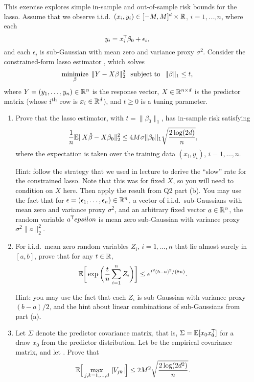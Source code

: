 \documentclass{article}
\begin{document}
\def\hSigma{\hat\Sigma}

This exercise explores simple in-sample and out-of-sample risk bounds for the
lasso. Assume that we observe i.i.d.\ $(x_i,y_i) \in [-M,M]^d \times \mathbb{R}$,
$i=1,\dots,n$, where each   
\[
y_i = x_i^{\mathsf{T}} \beta_0 + \epsilon_i,
\]
and each $\epsilon_i$ is sub-Gaussian with mean zero and variance proxy
$\sigma^2$. Consider the constrained-form lasso estimator \smash{$\hbeta$}, 
which solves  
\[
\mathop{\mathrm{minimize}}_\beta \; \|Y - X\beta\|_2^2 \;\; \mathop{\mathrm{subject\,\,to}} \;\; \|\beta\|_1 \leq t,    
\]
where $Y = (y_1,\dots,y_n) \in \mathbb{R}^n$ is the response vector, $X \in \mathbb{R}^{n \times
  d}$ is the predictor matrix (whose $i^{\text{th}}$ row is $x_i \in \mathbb{R}^d$), and $t \geq
0$ is a tuning parameter.

\begin{enumerate}[label=(\alph*)]
\item Prove that the lasso estimator, with $t=\|\beta_0\|_1$, has in-sample risk
  satisfying 
  \marginpar{\small [3 pts]}
  \[
  \frac{1}{n} \mathbb{E} \|X\hat{\beta} - X\beta_0\|_2^2 \leq 4M \sigma \|\beta_0\|_1
  \sqrt{\frac{2 \log(2d)}{n}},  
  \]
  where the expectation is taken over the training data $(x_i,y_i)$,
  $i=1,\dots,n$. 

  Hint: follow the strategy that we used in lecture to derive the ``slow'' rate 
  for the constrained lasso. Note that this was for fixed $X$, so you will need
  to condition on $X$ here. Then apply the result from Q2 part (b). You may use
  the fact that for $\epsilon = (\epsilon_1,\dots,\epsilon_n) \in \mathbb{R}^n$, a
  vector of i.i.d.\ sub-Gaussians with mean zero and variance proxy $\sigma^2$,
  and an arbitrary fixed vector $a \in \mathbb{R}^n$, the random variable $a^{\mathsf{T}} epsilon$
  is mean zero sub-Gaussian with variance proxy $\sigma^2 \|a\|_2^2$. 

\item For i.i.d.\ mean zero random variables $Z_i$, $i=1,\dots,n$ that lie
  almost surely in $[a,b]$, prove that for any $t \in \mathbb{R}$, 
  \marginpar{\small [2 pts]}
  \[
  \mathbb{E} \bigg[\exp \bigg(\frac{t}{n} \sum_{i=1}^n Z_i \bigg)\bigg] \leq
  e^{t^2(b-a)^2/(8n)}.  
  \]

  Hint: you may use the fact that each $Z_i$ is sub-Gaussian with variance proxy
  $(b-a)/2$, and the hint about linear combinations of sub-Gaussians from part
  (a).  

\item Let $\Sigma$ denote the predictor covariance matrix, that is,
  $\Sigma = \mathbb{E}[x_0x_0^{\mathsf{T}}]$ for a draw $x_0$ from the predictor distribution. Let
  \smash{$\hSigma = X^\T X/n$} be the empirical covariance matrix, and let
  \smash{$V = \hSigma-\Sigma$}. Prove that    
  \marginpar{\small [2 pts]}
  \[
  \mathbb{E}\Big[ \max_{j,k=1,\dots,d} \, |V_{jk}| \Big] \leq 2M^2 \sqrt{\frac{2
      \log(2d^2)}{n}}.  
  \]


\end{enumerate}
\end{document}
